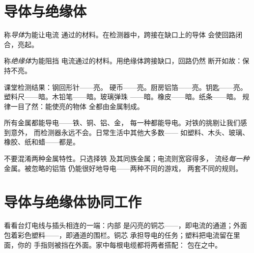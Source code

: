 \section{导体与绝缘体}

\begin{definition}[导体]\label{def:g4:conductors-insulators:conductor}
称\emph{导体}为能让电流
通过的材料。在检测器中，跨接在缺口上的导体
会使回路闭合，亮起。
\end{definition}

\begin{definition}[绝缘体]\label{def:g4:conductors-insulators:insulator}
称\emph{绝缘体}为能阻挡
电流通过的材料。用绝缘体跨接缺口，回路仍然
断开如故：保持不亮。
\end{definition}

\begin{example}[一上午的测试]\label{ex:g4:conductors-insulators:trials}
课堂检测结果：钢回形针——亮。
硬币——亮。厨房铝箔——亮。钥匙——亮。
塑料尺——暗。木铅笔——暗。玻璃弹珠
——暗。橡皮——暗。纸条——暗。
规律一目了然：能使亮的物体
全都由金属制成。
\end{example}

\begin{proposition}[金属导电]\label{prop:g4:conductors-insulators:metals}
所有金属都能导电——铁、铜、铝、金，
每一种都能导电。对铁的挑剔让我们感到意外，
而检测器永远不会。日常生活中其他大多数——
如塑料、木头、玻璃、橡胶、纸和蜡——都是。
\end{proposition}

\begin{remark}[导体并不都有磁性]\label{rem:g4:conductors-insulators:notmagnet}
不要混淆两种金属特性。只选择铁
及其同族金属；电流则宽容得多，
流经\emph{每一种}金属。被忽略的铝箔
仍能很好地导电——两种不同的游戏，
两套不同的规则。
\end{remark}

\section{导体与绝缘体协同工作}

\begin{example}[导线的构造]\label{ex:g4:conductors-insulators:wire}
看看台灯电线与插头相连的一端：内部
是闪亮的铜芯——，即电流的通道；外面
包着彩色塑料——，即通道的围栏。铜芯
承担导电的任务；塑料把电流留在里面，你的
手指则被挡在外面。家中每根电缆都将两者搭配：
包在之中。
\end{example}

